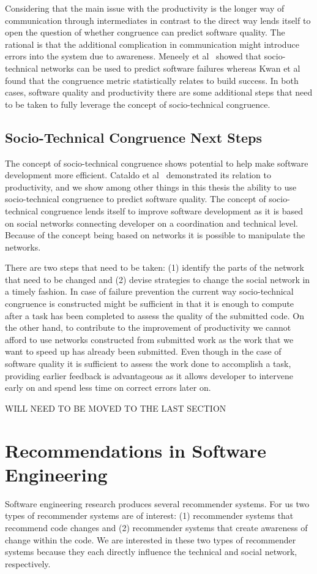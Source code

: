 Considering that the main issue with the productivity is the longer way of communication through intermediates in contrast to the direct way lends itself to open the question of whether congruence can predict software quality.
The rational is that the additional complication in communication might introduce errors into the system due to awareness.
Meneely et al~\cite{meneely:fse:2008} showed that socio-technical networks can be used to predict software failures whereas Kwan et al~\cite{kwan:tse:2011} found that the congruence metric statistically relates to build success.
In both cases, software quality and productivity there are some additional steps that need to be taken to fully leverage the concept of socio-technical congruence.

\subsection{Socio-Technical Congruence Next Steps}
The concept of socio-technical congruence shows potential to help make software development more efficient.
Cataldo et al~\cite{cataldo:cscw:2006} demonstrated its relation to productivity, and we show among other things in this thesis the ability to use socio-technical congruence to predict software quality.
The concept of socio-technical congruence lends itself to improve software development as it is based on social networks connecting developer on a coordination and technical level.
Because of the concept being based on networks it is possible to manipulate the networks.

There are two steps that need to be taken:
(1) identify the parts of the network that need to be changed
and (2) devise strategies to change the social network in a timely fashion.
In case of failure prevention the current way socio-technical congruence is constructed might be sufficient in that it is enough to compute after a task has been completed to assess the quality of the submitted code.
On the other hand, to contribute to the improvement of productivity we cannot afford to use networks constructed from submitted work as the work that we want to speed up has already been submitted.
Even though in the case of software quality it is sufficient to assess the work done to accomplish a task, providing earlier feedback is advantageous as it allows developer to intervene early on and spend less time on correct errors later on.

WILL NEED TO BE MOVED TO THE LAST SECTION

\section{Recommendations in Software Engineering}
Software engineering research produces several recommender systems.
For us two types of recommender systems are of interest:
(1) recommender systems that recommend code changes
and (2) recommender systems that create awareness of change within the code.
We are interested in these two types of recommender systems because they each directly influence the technical and social network, respectively.

